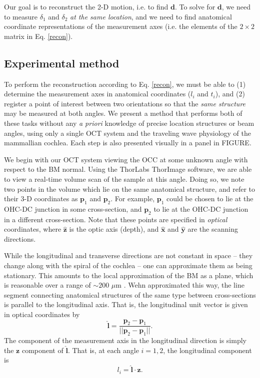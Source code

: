 \documentclass[preprint,NumberedRefs]{JASA}
\begin{document}
\par{Our goal is to reconstruct the 2-D motion, i.e. to find $\mathbf{d}$. To solve for $\mathbf{d}$, we need to measure $\delta_1$ and $\delta_2$ \textit{at the same location}, and we need to find anatomical coordinate representations of the measurement axes (i.e. the elements of the $2\times 2$ matrix in Eq. \ref{recon}).}
\subsection{Experimental method}
\par{To perform the reconstruction according to Eq. \ref{recon}, we must be able to (1) determine the measurement axes in anatomical coordinates ($l_i$ and $t_i$), and (2) register a point of interest between two orientations so that the \textit{same structure} may be measured at both angles. We present a method that performs both of these tasks without any \textit{a priori} knowledge of precise location structures or beam angles, using only a single OCT system and the traveling wave physiology of the mammallian cochlea. Each step is also presented visually in a panel in FIGURE.}
\par{We begin with our OCT system viewing the OCC at some unknown angle with respect to the BM normal. Using the ThorLabs ThorImage software, we are able to view a real-time volume scan of the sample at this angle. Doing so, we note two points in the volume which lie on the same anatomical structure, and refer to their 3-D coordinates as $\mathbf{p}_1$ and $\mathbf{p}_2$. For example, $\mathbf{p}_1$ could be chosen to lie at the OHC-DC junction in some cross-section, and $\mathbf{p}_2$ to lie at the OHC-DC junction in a different cross-section. Note that these points are specified in \textit{optical} coordinates, where $\mathbf{\hat{z}}$ is the optic axis (depth), and $\mathbf{\hat{x}}$ and $\mathbf{\hat{y}}$ are the scanning directions.}
\par{While the longitudinal and transverse directions are not constant in space -- they change along with the spiral of the cochlea -- one can approximate them as being stationary. This amounts to the local approximation of the BM as a plane, which is reasonable over a range of $\sim 200$ $\mu$m \citep{frost2022}. Wehn approximated this way, the line segment connecting anatomical structures of the same type between cross-sections is parallel to the longitudinal axis. That is, the longitudinal unit vector is given in optical coordinates by
\begin{equation}
	\mathbf{\hat{l}} = \frac{\mathbf{p}_2-\mathbf{p}_1}{||\mathbf{p}_2-\mathbf{p}_1||}.
\end{equation}
The component of the measurement axis in the longitudinal direction is simply the $\mathbf{z}$ component of $\mathbf{\hat{l}}$. That is, at each angle $i=1,2$, the longitudinal component is
\begin{equation}
	l_i = \mathbf{\hat{l}}\cdot\mathbf{z}.
\end{equation}
}
\end{document}
